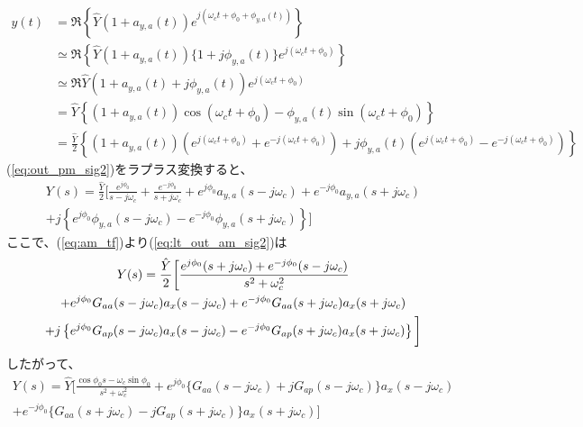 \documentclass[book]{jlreq}
\begin{document}
\begin{equation}
    \begin{split}
        y(t) &= \Re\left \{\hat{Y}(1 + a_{y,a}(t))e^{j(\omega_c t + \phi_0 + \phi_{y,a} (t))}\right \} \\
        &\simeq \Re\left \{\hat{Y}(1 + a_{y, a}(t))\{1 + j \phi_{y, a} (t)\}e^{j(\omega_c t +  \phi_0)}\right \} \\ 
        &\simeq\Re{\hat{Y}(1 + a_{y, a}(t)+ j \phi_{y, a} (t))e^{j(\omega_c t +  \phi_0)}} \\ 
        &= \hat{Y}\left \{(1+ a_{y,a}(t))\cos(\omega_c t +  \phi_0) 
        - \phi_{y, a}(t)\sin(\omega_c t +  \phi_0) \right \} \\
        &= \frac{\hat{Y}}{2}\left \{\left (1+a_{y,a}(t)\right )\left (e^{j(\omega_c t 
        + \phi_0)}+e^{-j(\omega_c t+\phi_0)}\right )
        +j \phi_{y,a}(t)\left (e^{j(\omega_c t+\phi_0)}-e^{-j(\omega_c t + \phi_0)}\right ) \right \}
        \label{eq:out_pm_sig2}
    \end{split}
\end{equation}
%
(\ref{eq:out_pm_sig2})をラプラス変換すると、
%
\begin{multline}
    Y(s) = \frac{\hat{Y}}{2}\biggr [\frac{e^{j\phi_0}}{s-j\omega_c}+\frac{e^{-j\phi_0}}{s+j\omega_c} 
    + e^{j\phi_0}a_{y, a}(s - j\omega_c) + e^{-j\phi_0}a_{y, a}(s+j\omega_c) \\
    + j\left \{e^{j\phi_0}\phi_{y,a}(s-j\omega_c) - e^{-j\phi_0}\phi_{y,a}(s+j\omega_c) \right \} \biggl ]
    \label{eq:lt_out_am_sig2}
\end{multline}
%
ここで、(\ref{eq:am_tf})より(\ref{eq:lt_out_am_sig2})は
%
\begin{multline}
    Y(s) = \frac{\hat{Y}}{2}\biggr [\frac{e^{j\phi_0}(s+j\omega_c) + e^{-j\phi_0}(s-j\omega_c)}{s^2 + \omega_c^2}\\
        + e^{j\phi_0}G_{aa}(s-j\omega_c)a_x(s - j\omega_c) + e^{-j\phi_0}G_{aa}(s+j\omega_c)a_x(s+j\omega_c) \\
        + j\left \{e^{j\phi_0}G_{ap}(s-j\omega_c)a_x(s-j\omega_c) 
        - e^{-j\phi_0}G_{ap}(s+j\omega_c)a_x(s+j\omega_c) \right \} \biggl ]\notag 
\end{multline}
%
したがって、
%
\begin{multline}
    Y(s) = \hat{Y}\biggr [\frac{\cos\phi_0 s - \omega_c\sin\phi_0}{s^2+\omega_c^2}
    + e^{j\phi_0}\{G_{aa}(s-j\omega_c)+j G_{ap}(s-j\omega_c)\}a_x(s-j\omega_c) \\
    + e^{-j\phi_0}\{G_{aa}(s+j\omega_c)- j G_{ap}(s+j\omega_c)\}a_x(s+j\omega_c)\biggl ]
    \label{eq:lt_out_am_sig3}
\end{multline}
\end{document}
